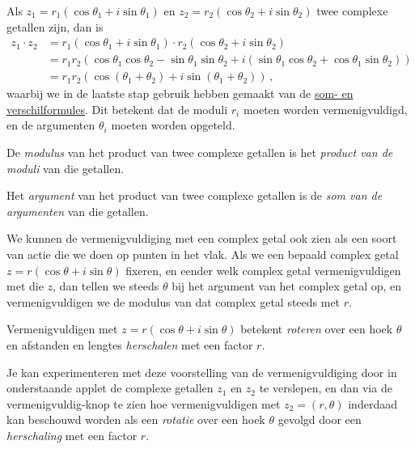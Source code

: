 \documentclass{ximera}
\begin{document}
Als $z_1=r_1 (\cos \theta_1 + i \sin \theta_1 ) $ en $z_2 = r_2(\cos \theta_2 + i \sin \theta_2 )$ twee complexe getallen zijn, dan is
\begin{align*}
z_1\cdot z_2 &= r_1 (\cos \theta_1 + i \sin \theta_1 )\cdot r_2 (\cos\theta_2 + i \sin \theta_2 )\\
             &= r_1 r_2 (\cos \theta_1 \cos \theta_2 - \sin \theta_1  \sin\theta_2 + i(\sin \theta_1 \cos \theta_2 + \cos \theta_1  \sin
\theta_2 ))\\
             &= r_1 r_2 ( \cos(\theta_1 + \theta_2) + i \sin(\theta_1 + \theta_2)) \, ,
\end{align*}
waarbij we in de laatste stap gebruik hebben gemaakt van de \hyperref[xim:goniometrie_formules]{som- en verschilformules}. 
Dit betekent dat de moduli $r_i$ moeten worden vermenigvuldigd, en de argumenten $\theta_i$ moeten worden opgeteld.

\begin{proposition}\label{eig:vermenigvuldiging_complexe_getallen}\nl
	
De \textit{modulus} van het product van twee complexe getallen is het \textit{product van de moduli} van die getallen.

Het \textit{argument} van het product van twee complexe getallen is de \textit{som van de argumenten} van die getallen.
\end{proposition}

\begin{xmuitweiding}
We kunnen de vermenigvuldiging met een complex getal ook zien als een soort van actie die we doen op punten in het vlak. Als we een bepaald complex getal $z = r(\cos\theta + i \sin \theta)$ fixeren, en eender welk complex getal vermenigvuldigen met die $z$, dan tellen we steeds $\theta$ bij het argument van het complex getal op, en vermenigvuldigen we de modulus van dat complex getal steeds met $r$.

\begin{proposition}[Vermenigvuldiging met een complex getal in goniometrische schrijfwijze $z=r(\cos\theta + i\sin\theta)$]\nl
	
Vermenigvuldigen met $z = r(\cos\theta + i\sin\theta)$ betekent \textit{roteren} over een hoek $\theta$ en afstanden en lengtes \textit{herschalen} met een factor $r$.
\end{proposition}

Je kan experimenteren met deze voorstelling van de vermenigvuldiging door in onderstaande applet de complexe getallen $z_1$ en $z_2$ te verslepen, en dan via de vermenigvuldig-knop te zien hoe vermenigvuldigen met $z_2 = (r,\theta)$ inderdaad kan beschouwd worden als een \textit{rotatie} over een hoek $\theta$ gevolgd door een \textit{herschaling} met een factor $r$.

\end{xmuitweiding}
\end{document}
